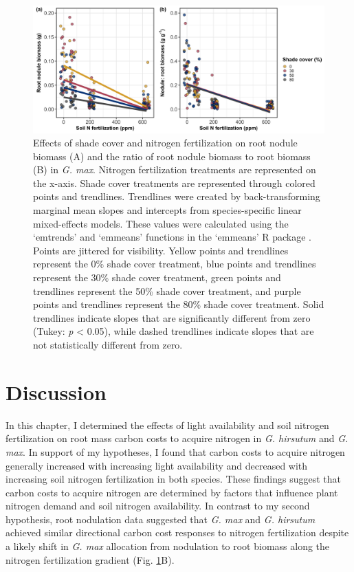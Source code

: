 \newpage
\begin{landscape}

\begin{figure}
    \centering
    \includegraphics[scale = 0.061]{ch2_LxN_Greenhouse/figs/fig4_nodwgt.png}
    \caption[Effects of shade cover and nitrogen fertilization on root nodule biomass and the ratio of root nodule biomass to root biomass in \textit{G. max}.]{Effects of shade cover and nitrogen fertilization on root nodule biomass (A) and the ratio of root nodule biomass to root biomass (B) in \textit{G. max}. Nitrogen fertilization treatments are represented on the x-axis. Shade cover treatments are represented through colored points and trendlines. Trendlines were created by back-transforming marginal mean slopes and intercepts from species-specific linear mixed-effects models. These values were calculated using the ‘emtrends’ and ‘emmeans’ functions in the ‘emmeans’ R package . Points are jittered for visibility. Yellow points and trendlines represent the 0\% shade cover treatment, blue points and trendlines represent the 30\% shade cover treatment, green points and trendlines represent the 50\% shade cover treatment, and purple points and trendlines represent the 80\% shade cover treatment. Solid trendlines indicate slopes that are significantly different from zero (Tukey: \textit{p} < 0.05), while dashed trendlines indicate slopes that are not statistically different from zero.}
    \label{fig:figure2.4}
\end{figure}
\end{landscape}
\clearpage

\section{Discussion}
In this chapter, I determined the effects of light availability and soil nitrogen fertilization on root mass carbon costs to acquire nitrogen in \textit{G. hirsutum} and \textit{G. max}. In support of my hypotheses, I found that carbon costs to acquire nitrogen generally increased with increasing light availability and decreased with increasing soil nitrogen fertilization in both species. These findings suggest that carbon costs to acquire nitrogen are determined by factors that influence plant nitrogen demand and soil nitrogen availability. In contrast to my second hypothesis, root nodulation data suggested that \textit{G. max} and \textit{G. hirsutum} achieved similar directional carbon cost responses to nitrogen fertilization despite a likely shift in \textit{G. max} allocation from nodulation to root biomass along the nitrogen fertilization gradient (Fig. \ref{fig:figure2.4}B).

